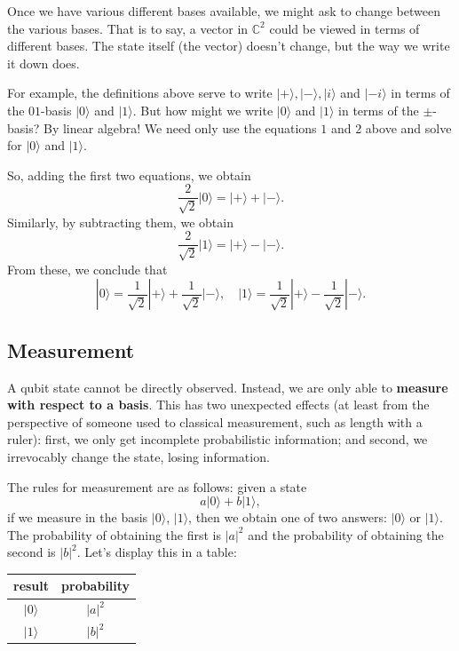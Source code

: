 \documentclass{article}
\theoremstyle{plain}
\theoremstyle{definition}
\theoremstyle{remark}
\numberwithin{theorem}{section}
\newcommand{\CC}{\mathbb{C}}
\begin{document}
Once we have various different bases available, we might ask to change between the various bases.  That is to say, a vector in $\CC^2$ could be viewed in terms of different bases.  The state itself (the vector) doesn't change, but the way we write it down does.  

For example, the definitions above serve to write $|+\rangle, |-\rangle, |i\rangle$ and $|-i\rangle$ in terms of the $01$-basis $|0\rangle$ and $|1\rangle$.  But how might we write $|0\rangle$ and $|1\rangle$ in terms of the $\pm$-basis?  By linear algebra!  We need only use the equations $1$ and $2$ above and solve for $|0\rangle$ and $|1\rangle$.

So, adding the first two equations, we obtain
\[
\frac{2}{\sqrt{2}} |0\rangle = |+\rangle + |-\rangle.
\]
Similarly, by subtracting them, we obtain
\[
\frac{2}{\sqrt{2}} |1\rangle = |+ \rangle - |-\rangle.
\]
From these, we conclude that
\[
|0\rangle = \frac{1}{\sqrt{2}} |+\rangle + \frac{1}{\sqrt{2}} |-\rangle, \quad
|1\rangle = \frac{1}{\sqrt{2}} |+ \rangle - \frac{1}{\sqrt{2}} |-\rangle.
\]
\subsection{Measurement}

A qubit state cannot be directly observed.  Instead, we are only able to \textbf{measure with respect to a basis}.  This has two unexpected effects (at least from the perspective of someone used to classical measurement, such as length with a ruler):  first, we only get incomplete probabilistic information; and second, we irrevocably change the state, losing information.

The rules for measurement are as follows:  given a state
\[
a | 0 \rangle + b | 1 \rangle,
\]
if we measure in the basis $|0 \rangle$, $|1 \rangle$, then we obtain one of two answers: $|0\rangle$ or $|1 \rangle$.  The probability of obtaining the first is $|a|^2$ and the probability of obtaining the second is $|b|^2$.  Let's display this in a table:
\begin{center}

\begin{tabular}{cc}
result & probability \\
\hline
$|0\rangle$ & $|a|^2$ \\
$|1\rangle$ & $|b|^2$ \\
\end{tabular}

\end{center}
\end{document}
